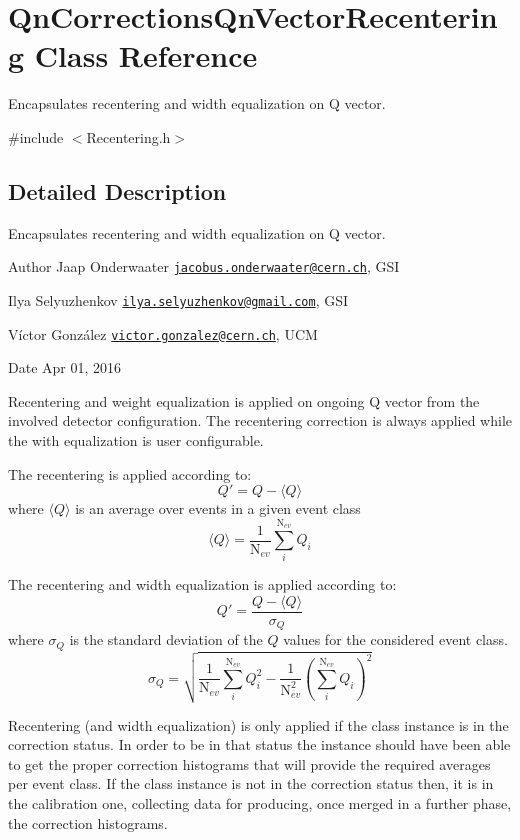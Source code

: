 \hypertarget{classQnCorrectionsQnVectorRecentering}{}\section{Qn\+Corrections\+Qn\+Vector\+Recentering Class Reference}
\label{classQnCorrectionsQnVectorRecentering}


Encapsulates recentering and width equalization on Q vector.  




{\ttfamily \#include $<$Recentering.\+h$>$}



\subsection{Detailed Description}
Encapsulates recentering and width equalization on Q vector. 

\begin{DoxyAuthor}{Author}
Jaap Onderwaater \href{mailto:jacobus.onderwaater@cern.ch}{\tt jacobus.\+onderwaater@cern.\+ch}, G\+SI 

Ilya Selyuzhenkov \href{mailto:ilya.selyuzhenkov@gmail.com}{\tt ilya.\+selyuzhenkov@gmail.\+com}, G\+SI 

Víctor González \href{mailto:victor.gonzalez@cern.ch}{\tt victor.\+gonzalez@cern.\+ch}, U\+CM 
\end{DoxyAuthor}
\begin{DoxyDate}{Date}
Apr 01, 2016
\end{DoxyDate}
Recentering and weight equalization is applied on ongoing Q vector from the involved detector configuration. The recentering correction is always applied while the with equalization is user configurable.

The recentering is applied according to\+: \[ Q' = Q - {\langle Q \rangle} \] where $\langle Q \rangle$ is an average over events in a given event class \[ \langle Q \rangle = \frac{1}{\mbox{N}_{ev}} \sum_{i}^{\mbox{N}_{ev}} Q_i \]

The recentering and width equalization is applied according to\+: \[ Q' = \frac{Q- \langle Q \rangle}{\sigma_Q} \] where $ \sigma_Q $ is the standard deviation of the $ Q $ values for the considered event class. \[ \sigma_Q = \sqrt{ \frac{1}{\mbox{N}_{ev}} \sum_{i}^{\mbox{N}_{ev}} Q^2_i - \frac{1}{\mbox{N}^2_{ev}} \left(\sum_{i}^{\mbox{N}_{ev}} Q_i \right)^2} \]

Recentering (and width equalization) is only applied if the class instance is in the correction status. In order to be in that status the instance should have been able to get the proper correction histograms that will provide the required averages per event class. If the class instance is not in the correction status then, it is in the calibration one, collecting data for producing, once merged in a further phase, the correction histograms.


